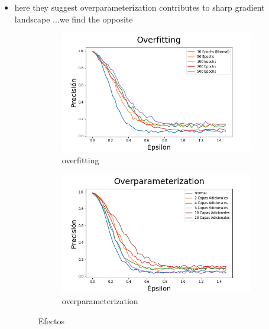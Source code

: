 \begin{itemize}
    \item here they suggest overparameterization contributes to sharp gradient landscape \cite{ma2020understanding}...we find the opposite
    \begin{figure}[h]
        \centering
        \begin{subfigure}[b]{0.49\textwidth}
            \centering
            \includegraphics[width=\textwidth]{images/overfit_vs_attack.png}
            \caption{overfitting}
            \label{overfit}
        \end{subfigure}
        \begin{subfigure}[b]{0.49\textwidth}
            \centering
            \includegraphics[width=\textwidth]{images/overparam_vs_attack.png}
            \caption{overparameterization}
            \label{overparam}
        \end{subfigure}
        \caption{Efectos}
        \label{overaparam_overfit}
    \end{figure}
    

\end{itemize}
